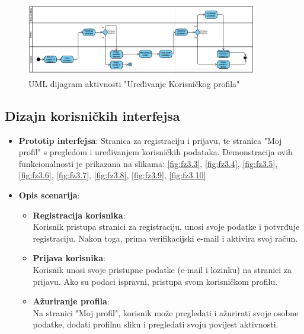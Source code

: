 \begin{figure}[H]
    \centering
    \includegraphics[width=0.9\textwidth]{Slike/fz3.2.png}
    \caption{UML dijagram aktivnosti "Uređivanje Korisničkog profila"}
    \label{fig:fz3.2}
\end{figure}

\sloppy

\subsection{Dizajn korisničkih interfejsa}

\begin{itemize}
    \item \textbf{Prototip interfejsa}: Stranica za registraciju i prijavu, te stranica "Moj profil" s pregledom i uređivanjem korisničkih podataka. Demonstracija ovih funkcionalnosti je prikazana na slikama: \ref{fig:fz3.3}, \ref{fig:fz3.4}, \ref{fig:fz3.5}, \ref{fig:fz3.6}, \ref{fig:fz3.7}, \ref{fig:fz3.8}, \ref{fig:fz3.9}, \ref{fig:fz3.10}
    \item \textbf{Opis scenarija}:
    \begin{itemize}
        \item \textbf{Registracija korisnika}: \\
        Korisnik pristupa stranici za registraciju, unosi svoje podatke i potvrđuje registraciju. Nakon toga, prima verifikacijski e-mail i aktivira svoj račun.
        
        \item \textbf{Prijava korisnika}: \\
        Korisnik unosi svoje pristupne podatke (e-mail i lozinku) na stranici za prijavu. Ako su podaci ispravni, pristupa svom korisničkom profilu.
        
        \item \textbf{Ažuriranje profila}: \\
        Na stranici "Moj profil", korisnik može pregledati i ažurirati svoje osobne podatke, dodati profilnu sliku i pregledati svoju povijest aktivnosti.
    \end{itemize}
\end{itemize}

